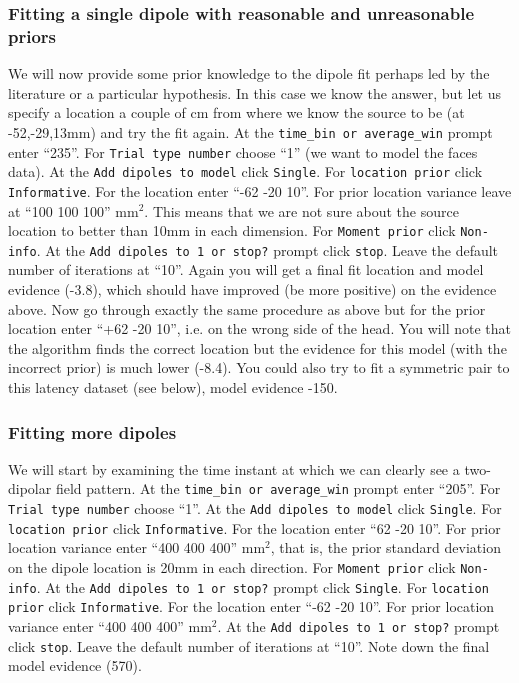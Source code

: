 \subsubsection{Fitting a single dipole with reasonable and unreasonable priors}
We will now provide some prior knowledge to the dipole fit perhaps led by the literature or a particular hypothesis. In this case we know the answer, but let us specify a location a couple of cm from where we know the source to be (at -52,-29,13mm) and try the fit again.
At the  \texttt{time\_bin or average\_win} prompt enter ``235''. For  \texttt{Trial type number} choose ``1'' (we want to model the faces data). At the  \texttt{Add dipoles to model} click  \texttt{Single}. For  \texttt{location prior} click  \texttt{Informative}. For the location enter ``-62 -20 10''. For prior location variance leave at ``100 100 100'' mm$^2$. This means that we are not sure about the source location to better than 10mm in each dimension. For  \texttt{Moment prior} click  \texttt{Non-info}. At the  \texttt{Add dipoles to 1 or stop?} prompt click  \texttt{stop}. Leave the default number of iterations at ``10''. Again you will get a final fit location and model evidence (-3.8), which should have improved (be more positive) on the evidence above. 
Now go through exactly the same procedure as above but for the prior location enter ``+62 -20 10'', i.e. on the wrong side of the head. You will note that the algorithm finds the correct location but the evidence for this model (with the incorrect prior) is much lower (-8.4). You could also try to fit a symmetric pair to this latency dataset (see below), model evidence -150.

\subsubsection{Fitting more dipoles}
We will start by examining the time instant at which we can clearly see a two-dipolar field pattern.
At the \texttt{time\_bin or average\_win} prompt enter ``205''. For \texttt{Trial type number} choose ``1''. At the \texttt{Add dipoles to model} click \texttt{Single}. For \texttt{location prior} click \texttt{Informative}. For the location enter ``62 -20 10''. For prior location variance enter ``400 400 400'' mm$^2$, that is, the prior standard deviation on the dipole location is 20mm in each direction. For \texttt{Moment prior} click \texttt{Non-info}. At the \texttt{Add dipoles to 1 or stop?} prompt click \texttt{Single}. For \texttt{location prior} click \texttt{Informative}. For the location enter ``-62 -20 10''. For prior location variance enter ``400 400 400'' mm$^2$. At the \texttt{Add dipoles to 1 or stop?} prompt click \texttt{stop}. Leave the default number of iterations at ``10''. Note down the final model evidence (570). 

